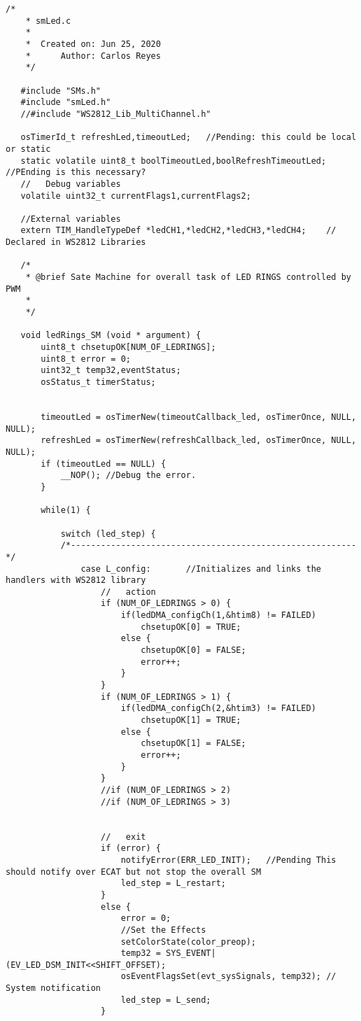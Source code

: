 \begin{lstlisting}[label=lst:led,caption={Main source code for LED DSM.}]
    /*
    * smLed.c
    *
    *  Created on: Jun 25, 2020
    *      Author: Carlos Reyes
    */
   
   #include "SMs.h"
   #include "smLed.h"
   //#include "WS2812_Lib_MultiChannel.h"
   
   osTimerId_t refreshLed,timeoutLed;	//Pending: this could be local or static
   static volatile uint8_t boolTimeoutLed,boolRefreshTimeoutLed;	//PEnding is this necessary?
   //	Debug variables
   volatile uint32_t currentFlags1,currentFlags2;
   
   //External variables
   extern TIM_HandleTypeDef *ledCH1,*ledCH2,*ledCH3,*ledCH4;	//	Declared in WS2812 Libraries
   
   /*
    * @brief Sate Machine for overall task of LED RINGS controlled by PWM
    *
    */
   
   void ledRings_SM (void * argument) {
       uint8_t chsetupOK[NUM_OF_LEDRINGS];
       uint8_t error = 0;
       uint32_t temp32,eventStatus;
       osStatus_t timerStatus;
   
   
       timeoutLed = osTimerNew(timeoutCallback_led, osTimerOnce, NULL, NULL);
       refreshLed = osTimerNew(refreshCallback_led, osTimerOnce, NULL, NULL);
       if (timeoutLed == NULL) {
           __NOP();	//Debug the error.
       }
   
       while(1) {
   
           switch (led_step) {
           /*---------------------------------------------------------*/
               case	L_config:		//Initializes and links the handlers with WS2812 library
                   //	action
                   if (NUM_OF_LEDRINGS > 0) {
                       if(ledDMA_configCh(1,&htim8) != FAILED)
                           chsetupOK[0] = TRUE;
                       else {
                           chsetupOK[0] = FALSE;
                           error++;
                       }
                   }
                   if (NUM_OF_LEDRINGS > 1) {
                       if(ledDMA_configCh(2,&htim3) != FAILED)
                           chsetupOK[1] = TRUE;
                       else {
                           chsetupOK[1] = FALSE;
                           error++;
                       }
                   }
                   //if (NUM_OF_LEDRINGS > 2)
                   //if (NUM_OF_LEDRINGS > 3)
   
   
                   //	exit
                   if (error) {
                       notifyError(ERR_LED_INIT);	//Pending This should notify over ECAT but not stop the overall SM
                       led_step = L_restart;
                   }
                   else {
                       error = 0;
                       //Set the Effects
                       setColorState(color_preop);
                       temp32 = SYS_EVENT|(EV_LED_DSM_INIT<<SHIFT_OFFSET);
                       osEventFlagsSet(evt_sysSignals, temp32);	//	System notification
                       led_step = L_send;
                   }
   

\end{lstlisting}
